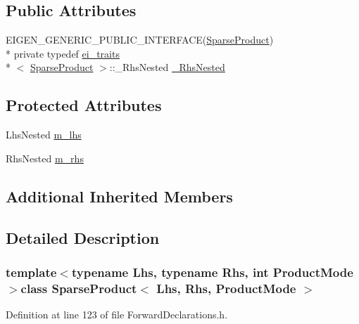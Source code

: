 \subsection*{Public Attributes}
\begin{DoxyCompactItemize}
\item 
E\-I\-G\-E\-N\-\_\-\-G\-E\-N\-E\-R\-I\-C\-\_\-\-P\-U\-B\-L\-I\-C\-\_\-\-I\-N\-T\-E\-R\-F\-A\-C\-E(\hyperlink{class_sparse_product}{Sparse\-Product}) \\*
private typedef \hyperlink{structei__traits}{ei\-\_\-traits}\\*
$<$ \hyperlink{class_sparse_product}{Sparse\-Product} $>$\-::\-\_\-\-Rhs\-Nested \hyperlink{class_sparse_product_a7141181a40741a5edf265e18053b5d92}{\-\_\-\-Rhs\-Nested}
\end{DoxyCompactItemize}
\subsection*{Protected Attributes}
\begin{DoxyCompactItemize}
\item 
Lhs\-Nested \hyperlink{class_sparse_product_a48ebd9deb893d47b6b8a837c5a8dd5c0}{m\-\_\-lhs}
\item 
Rhs\-Nested \hyperlink{class_sparse_product_a2129c7e922f18df965c7aa2b07c24b60}{m\-\_\-rhs}
\end{DoxyCompactItemize}
\subsection*{Additional Inherited Members}


\subsection{Detailed Description}
\subsubsection*{template$<$typename Lhs, typename Rhs, int Product\-Mode$>$class Sparse\-Product$<$ Lhs, Rhs, Product\-Mode $>$}



Definition at line 123 of file Forward\-Declarations.\-h.



